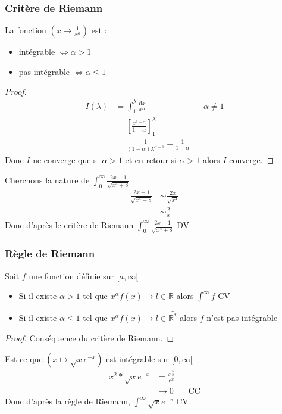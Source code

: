 \documentclass[11pt,colorlinks]{book}
\theoremstyle{mytheoremstyle}
\theoremstyle{mytheoremstyle}
\theoremstyle{mytheoremstyle}
\theoremstyle{mytheoremstyle}
\theoremstyle{mytheoremstyle}
\theoremstyle{mytheoremstyle}
\theoremstyle{mytheoremstyle}
\theoremstyle{mytheoremstyle}
\theoremstyle{myproblemstyle}
\def\mbb#1{\mathbb{#1}}
\def\bR{\mbb{R}}
\renewcommand{\equiv}{\sim}
\begin{document}
  \subsubsection{Critère de Riemann}
  \begin{theorem}
    La fonction $(x \mapsto \frac{1}{x^{\alpha}})$ est : 
    \begin{itemize}
      \item intégrable $\Leftrightarrow \alpha > 1$
      \item pas intégrable $\Leftrightarrow \alpha \leq 1$ 
    \end{itemize}
    \begin{proof}
      \begin{align*}
        I(\lambda) &= \int_1^{\lambda} \frac{\text{d}x}{x^{\alpha}} && \alpha \not= 1 \\
                  &= \left[\frac{x^{1 - \alpha}}{1 - \alpha}\right]_1^{\lambda} \\ 
                  &= \frac{1}{(1-\alpha)\lambda^{\alpha-1}} - \frac{1}{1-\alpha}
      \end{align*}
      Donc $I$ ne converge que si $\alpha > 1$ et en retour si $\alpha > 1$ alors $I$ converge.
    \end{proof}
  \end{theorem}
  \begin{ex}
    Cherchons la nature de $\int_0^{\infty} \frac{2x+1}{\sqrt{x^4+8}}$ 
    \begin{align*}
      \frac{2x+1}{\sqrt{x^4+8}} &\equiv \frac{2x}{\sqrt{x^4}} \\ 
                                &\equiv \frac{2}{x}
    \end{align*}
    Donc d'après le critère de Riemann $\int_0^{\infty} \frac{2x+1}{\sqrt{x^4+8}}$ DV
  \end{ex}
  \subsubsection{Règle de Riemann}
  \begin{prop}
    Soit $f$ une fonction définie sur $[a,\infty[$
    \begin{itemize}
      \item Si il existe $\alpha > 1$ tel que $x^{\alpha}f(x) \to l \in \bR$ alors $\int^{\infty} f$ CV
      \item Si il existe $\alpha \leq 1$ tel que $x^{\alpha}f(x) \to l \in \bar{\bR^{*}}$ alors $f$ n'est pas intégrable     
    \end{itemize}
    \begin{proof}
      Conséquence du critère de Riemann.
    \end{proof}
  \end{prop}
  \begin{ex}
    Est-ce que $(x \mapsto \sqrt{x}e^{-x})$ est intégrable sur $[0,\infty[$
    \begin{align*}
      x^2*\sqrt{x}e^{-x} &= \frac{x^{\frac{5}{2}}}{e^x} \\ 
                        &\to 0 && \text{CC} 
    \end{align*}
    Donc d'après la règle de Riemann, $\int^{\infty} \sqrt{x}e^{-x}$ CV
  \end{ex}
\end{document}

